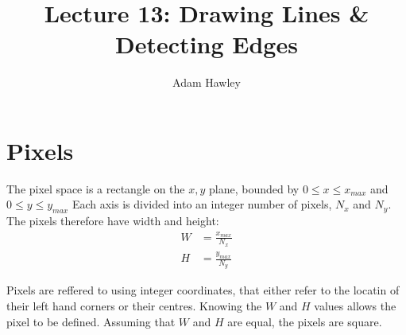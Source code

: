 \documentclass{article}
\author{Adam Hawley}
\title{Lecture 13: Drawing Lines \& Detecting Edges}
\begin{document}
\maketitle

\section{Pixels}
The pixel space is a rectangle on the $x,y$ plane, bounded by $0\le x\le x_{max}$ and $0\le y\le y_{max}$
Each axis is divided into an integer number of pixels, $N_x$ and $N_y$. The pixels therefore have width and height:
\begin{align*}
	W &= \frac{x_{max}}{N_x} \\
	H &= \frac{y_{max}}{N_y}
\end{align*}

Pixels are reffered to using integer coordinates, that either refer to the locatin of their left hand corners or their centres.
Knowing the $W$ and $H$ values allows the pixel to be defined.
Assuming that $W$ and $H$ are equal, the pixels are square.
\end{document}
